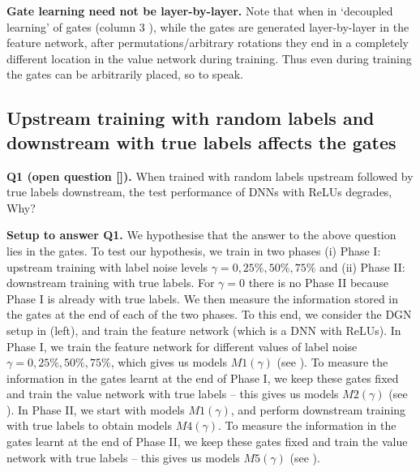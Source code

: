 \textbf{Gate learning need not be layer-by-layer.} Note that when in `decoupled learning' of gates (column $3$ ), while the gates are generated layer-by-layer in the feature network, after permutations/arbitrary rotations they end in a completely different location in the value network during training. Thus even during training the gates can be arbitrarily placed, so to speak.

\subsection{Upstream training with random labels and downstream with true labels affects the gates}\label{sec:exp2}


\textbf{Q1 (open question []).} {When trained with random labels upstream followed by true labels downstream, the test performance of DNNs with ReLUs degrades, Why?}

\textbf{Setup to answer Q1.} We hypothesise that the answer to the above question lies in the gates. To test our hypothesis, we train in two phases (i) Phase I: upstream training with label noise levels $\gamma=0, 25\%, 50\%, 75\%$ and (ii) Phase II: downstream training with true labels. For $\gamma=0$ there is no Phase II because Phase I is already with true labels. We then measure the information stored in the gates at the end of each of the two phases. To this end, we consider the DGN setup in  (left), and train the feature network (which is a DNN with ReLUs). In Phase I, we train the feature network for different values of label noise $\gamma=0, 25\%, 50\%, 75\%$, which gives us models $M1(\gamma)$ (see ). To measure the information in the gates learnt at the end of Phase I, we keep these gates fixed and train the value network with true labels -- this gives us models $M2(\gamma)$ (see ). In Phase II, we start with models $M1(\gamma)$, and perform downstream training with true labels to obtain models $M4(\gamma)$.  To measure the information in the gates learnt at the end of Phase II, we keep these gates fixed and train the value network with true labels -- this gives us models $M5(\gamma)$ (see ).

